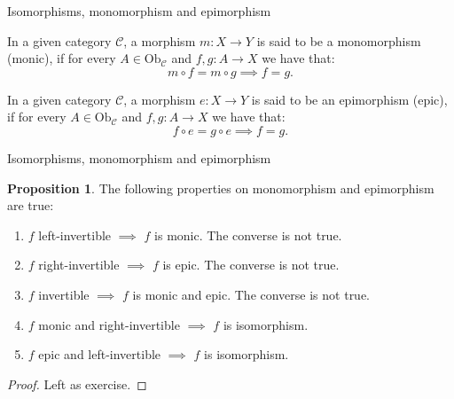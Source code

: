 \documentclass[aspectratio=169,xcolor=dvipsnames,10pt]{beamer}
\theoremstyle{definition}
\newtheorem{proposition}{Proposition}
\begin{document}

\begin{frame}[fragile]{Isomorphisms, monomorphism and epimorphism}
	\begin{definition}[Monomorphism]
        In a given category $\mathcal C$, a morphism $m:X\to Y$ is said to be a monomorphism (monic),
        if for every $A \in \text{Ob}_\mathcal C$ and $f,g:A \to X$ we have that:
        $$
        m\circ f = m\circ g \implies f = g.
        $$
	\end{definition}
	\begin{definition}[Epimorphism]
        In a given category $\mathcal C$, a morphism $e:X\to Y$ is said to be an epimorphism (epic),
        if for every $A \in \text{Ob}_\mathcal C$ and $f,g:A \to X$ we have that:
        $$
        f \circ e = g \circ e \implies f = g.
        $$
	\end{definition}
\end{frame}

\begin{frame}[fragile]{Isomorphisms, monomorphism and epimorphism}
    \begin{proposition}
        The following properties on monomorphism and epimorphism are true:
        \begin{enumerate}[1.]
            \item $f$ left-invertible $\implies$ $f$ is monic. The converse is not true.
            \item $f$ right-invertible $\implies$ $f$ is epic. The converse is not true.
            \item $f$ invertible $\implies$ $f$ is monic and epic. The converse is not true.
            \item $f$ monic and right-invertible $\implies $ $f$ is isomorphism.
            \item $f$ epic and left-invertible $\implies $ $f$ is isomorphism.
        \end{enumerate}
    \end{proposition}
    \begin{proof}
        Left as exercise.
    \end{proof}
\end{frame}
\end{document}
